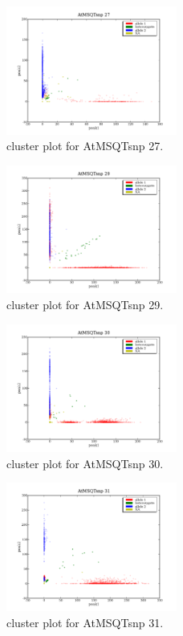 \begin{figure}[H]
\includegraphics[width=0.5\textwidth]{figures/cluster_plot_AtMSQTsnp_27.png}
\caption{cluster plot for AtMSQTsnp 27.} \label{flAtMSQTsnp27}
\end{figure}
\begin{figure}[H]
\includegraphics[width=0.5\textwidth]{figures/cluster_plot_AtMSQTsnp_29.png}
\caption{cluster plot for AtMSQTsnp 29.} \label{flAtMSQTsnp29}
\end{figure}
\begin{figure}[H]
\includegraphics[width=0.5\textwidth]{figures/cluster_plot_AtMSQTsnp_30.png}
\caption{cluster plot for AtMSQTsnp 30.} \label{flAtMSQTsnp30}
\end{figure}
\begin{figure}[H]
\includegraphics[width=0.5\textwidth]{figures/cluster_plot_AtMSQTsnp_31.png}
\caption{cluster plot for AtMSQTsnp 31.} \label{flAtMSQTsnp31}
\end{figure}
